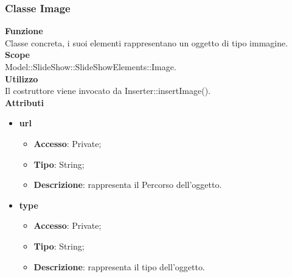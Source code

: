 {	\subsubsection{Classe Image}{
		\label{Image}
		\textbf{Funzione}\\
			\indent Classe concreta, i suoi elementi rappresentano un oggetto di tipo immagine.\\
	   	\textbf{Scope}\\
			\indent Model::SlideShow::SlideShowElements::Image.\\
		\textbf{Utilizzo}\\
			\indent Il costruttore viene invocato da Inserter::insertImage().\\
		\textbf{Attributi}
		\begin{itemize}
				\item \textbf{url}
				\begin{itemize}
					\item \textbf{Accesso}: Private;
					\item \textbf{Tipo}: String;
					\item \textbf{Descrizione}: rappresenta il Percorso dell’oggetto.
				\end{itemize}
				\item \textbf{type}
				\begin{itemize}
					\item \textbf{Accesso}: Private;
					\item \textbf{Tipo}: String;
					\item \textbf{Descrizione}: rappresenta il tipo dell'oggetto.
				\end{itemize}
		\end{itemize}
		}
		
}
